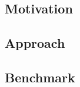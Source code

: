 \section{\NFGE{}}

\subsection{Motivation}
\frameready{
  
}

\subsection{Approach}
\frameready{
  
  
  
}

\subsection{Benchmark}
\frameready{


}

